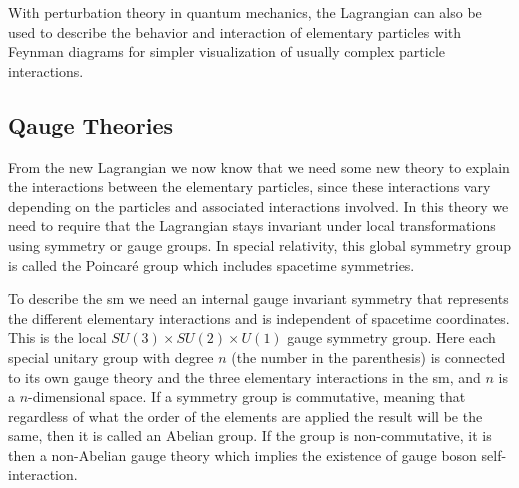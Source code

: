 \documentclass[a4paper, american, 12pt]{report}
\begin{document}
	With perturbation theory in quantum mechanics, the Lagrangian can also be used to describe the behavior and interaction of elementary particles with Feynman diagrams for simpler visualization of usually complex particle interactions.
	
	
	\subsection{Qauge Theories}
	\label{subsect:Theory-Qauge}
	From the new Lagrangian we now know that we need some new theory to explain the interactions between the elementary particles, since these interactions vary depending on the particles and associated interactions involved. In this theory we need to require that the Lagrangian stays invariant under local transformations using symmetry or gauge groups. In special relativity, this global symmetry group is called the Poincaré group which includes spacetime symmetries. 
	
	To describe the \acrshort{sm} we need an internal gauge invariant symmetry that represents the different elementary interactions and is independent of spacetime coordinates. This is the local $SU(3)\times SU(2)\times U(1)$ gauge symmetry group. Here each special unitary group with degree $n$ (the number in the parenthesis) is connected to its own gauge theory and the three elementary interactions in the \acrshort{sm}, and $n$ is a $n$-dimensional space. If a symmetry group is commutative, meaning that regardless of what the order of the elements are applied the result will be the same, then it is called an Abelian group. If the group is non-commutative, it is then a non-Abelian gauge theory which implies the existence of gauge boson self-interaction.
	
	
\end{document}
